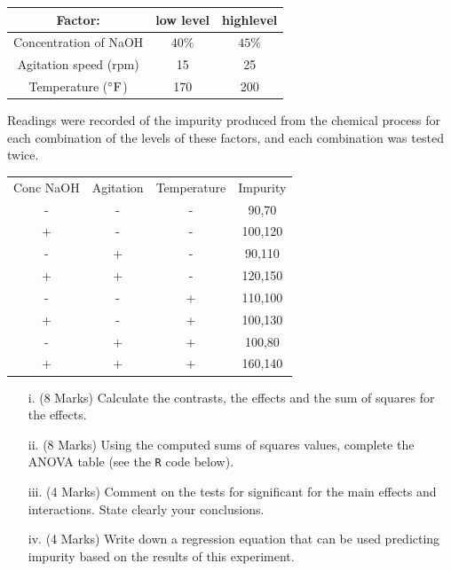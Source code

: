 \documentclass[a4paper,12pt]{article}
\begin{document}
\begin{center}
	\begin{tabular}{|c|c|c|}
		\hline
		Factor: &low level & highlevel  \\ \hline
		Concentration of NaOH & $40\%$ & $45\%$\\
		Agitation speed (rpm) & 15 & 25 \\
		Temperature ($^{\circ}{\rm F}$) & 170 & 200 \\
		\hline
	\end{tabular}
\end{center}
Readings were recorded of the impurity produced from the chemical process for each combination of the levels of these factors, and each combination was tested twice.
\begin{center}
	\begin{tabular}{|c|c|c|c|}
		\hline
		Conc NaOH & Agitation & Temperature & Impurity \\
		-	&	-	&	-	&	 90,70	\\
		+	&	-	&	-	&    100,120	\\
		-	&	+	&	-	&	 90,110	\\
		+	&	+	&	-	&	 120,150	\\
		-	&	-	&	+	&	 110,100\\
		+	&	-	&	+	&	 100,130	\\
		-	&	+	&	+	&	 100,80	\\
		+	&	+	&	+	&	 160,140\\
		\hline
	\end{tabular}
\end{center}
\begin{itemize}
	\item[i.] (8 Marks) Calculate the contrasts, the effects and the sum of squares for the effects.
	\item[ii.] (8 Marks) Using the computed sums of squares values, complete the ANOVA table (see the \texttt{R} code below).
	\item[iii.] (4 Marks) Comment on the tests for significant for the main effects and interactions. State clearly your conclusions.
	\item[iv.] (4 Marks) Write down a  regression equation that can be used predicting impurity based on the results of this experiment.
\end{itemize}
\end{document}
